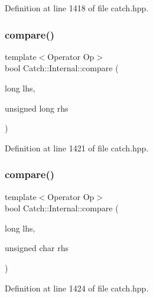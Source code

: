 Definition at line 1418 of file catch.\+hpp.

\hypertarget{namespace_catch_1_1_internal_ae9aec44a08d9cbb0d3dd46d438b50d2c}{}\label{namespace_catch_1_1_internal_ae9aec44a08d9cbb0d3dd46d438b50d2c} 
\subsubsection{\texorpdfstring{compare()}{compare()}\hspace{0.1cm}{\footnotesize\ttfamily [12/17]}}
{\footnotesize\ttfamily template$<$Operator Op$>$ \\
bool Catch\+::\+Internal\+::compare (\begin{DoxyParamCaption}\item[{long}]{lhs,  }\item[{unsigned long}]{rhs }\end{DoxyParamCaption})}



Definition at line 1421 of file catch.\+hpp.

\hypertarget{namespace_catch_1_1_internal_a79664b5f5f497fba57bd156e098de1f2}{}\label{namespace_catch_1_1_internal_a79664b5f5f497fba57bd156e098de1f2} 
\subsubsection{\texorpdfstring{compare()}{compare()}\hspace{0.1cm}{\footnotesize\ttfamily [13/17]}}
{\footnotesize\ttfamily template$<$Operator Op$>$ \\
bool Catch\+::\+Internal\+::compare (\begin{DoxyParamCaption}\item[{long}]{lhs,  }\item[{unsigned char}]{rhs }\end{DoxyParamCaption})}



Definition at line 1424 of file catch.\+hpp.

\hypertarget{namespace_catch_1_1_internal_a829570ad9e724c687aa42190a696032b}{}\label{namespace_catch_1_1_internal_a829570ad9e724c687aa42190a696032b} 
